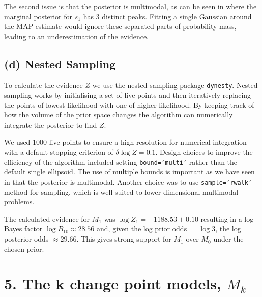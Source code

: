 \documentclass[11pt]{article}
\begin{document}
The second issue is that the posterior is multimodal, as can be seen in  where the marginal posterior for $s_1$ has 3 distinct peaks. Fitting a single Gaussian around the MAP estimate would ignore these separated parts of probability mass, leading to an underestimation of the evidence.

\subsection*{(d) Nested Sampling}
To calculate the evidence $Z$ we use the nested sampling package \texttt{dynesty}. Nested sampling works by initialising a set of live points and then iteratively replacing the points of lowest likelihood with one of higher likelihood. By keeping track of how the volume of the prior space changes the algorithm can numerically integrate the posterior to find $Z$.

We used 1000 live points to ensure a high resolution for numerical integration with a default stopping criterion of $\delta \log Z = 0.1$. Design choices to improve the efficiency of the algorithm included setting \texttt{bound='multi'} rather than the default single ellipsoid. The use of multiple bounds is important as we have seen in  that the posterior is multimodal. Another choice was to use \texttt{sample='rwalk'} method for sampling, which is well suited to lower dimensional multimodal problems.

The calculated evidence for $M_1$ was $\log{Z_1} = -1188.53 \pm 0.10$ resulting in a log Bayes factor $\log B_{10} \approx 28.56$ and, given the log prior odds $= \log 3$, the log posterior odds $\approx 29.66$. This gives strong support for $M_1$ over $M_0$ under the chosen prior.

\section*{5. The k change point models, $M_k$}
\end{document}
